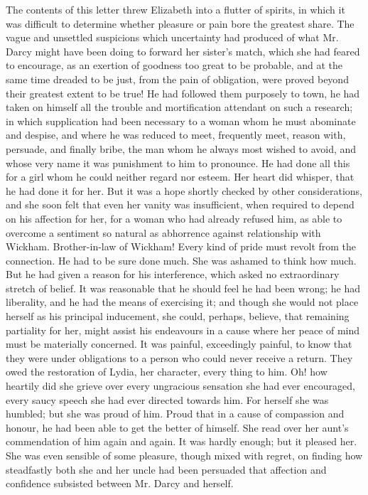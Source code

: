 The contents of this letter threw Elizabeth into a flutter
of spirits, in which it was difficult to determine whether
pleasure or pain bore the greatest share. The vague and
unsettled suspicions which uncertainty had produced of
what Mr. Darcy might have been doing to forward her
sister’s match, which she had feared to encourage, as an
exertion of goodness too great to be probable, and at the
same time dreaded to be just, from the pain of obligation,
were proved beyond their greatest extent to be true!
He had followed them purposely to town, he had taken
on himself all the trouble and mortification attendant on
such a research; in which supplication had been necessary
to a woman whom he must abominate and despise, and
where he was reduced to meet, frequently meet, reason
with, persuade, and finally bribe, the man whom he always
most wished to avoid, and whose very name it was punishment
to him to pronounce. He had done all this for
a girl whom he could neither regard nor esteem. Her
heart did whisper, that he had done it for her. But it
was a hope shortly checked by other considerations, and
she soon felt that even her vanity was insufficient, when
required to depend on his affection for her, for a woman
who had already refused him, as able to overcome a sentiment
so natural as abhorrence against relationship with
Wickham. Brother-in-law of Wickham! Every kind of
pride must revolt from the connection. He had to be sure
done much. She was ashamed to think how much. But
he had given a reason for his interference, which asked
no extraordinary stretch of belief. It was reasonable that
he should feel he had been wrong; he had liberality, and
he had the means of exercising it; and though she would
not place herself as his principal inducement, she could,
perhaps, believe, that remaining partiality for her, might
assist his endeavours in a cause where her peace of mind
must be materially concerned. It was painful, exceedingly
painful, to know that they were under obligations
to a person who could never receive a return. They owed
the restoration of Lydia, her character, every thing to
him. Oh! how heartily did she grieve over every ungracious
sensation she had ever encouraged, every saucy
speech she had ever directed towards him. For herself
she was humbled; but she was proud of him. Proud that
in a cause of compassion and honour, he had been able
to get the better of himself. She read over her aunt’s
commendation of him again and again. It was hardly
enough; but it pleased her. She was even sensible of
some pleasure, though mixed with regret, on finding how
steadfastly both she and her uncle had been persuaded
that affection and confidence subsisted between Mr. Darcy
and herself.

